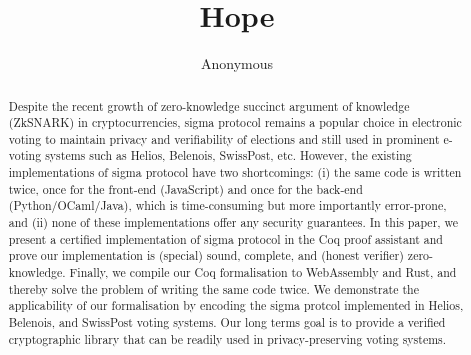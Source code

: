 \documentclass[conference,compsoc]{IEEEtran}
\begin{document}
\title{Hope}

\author{Anonymous}

\maketitle

\begin{abstract}
  Despite the recent growth of zero-knowledge succinct argument 
  of knowledge (ZkSNARK) in cryptocurrencies, 
  sigma protocol remains a popular choice in electronic voting to maintain privacy 
  and verifiability of elections and still used in prominent e-voting systems such as 
  Helios, Belenois, SwissPost, etc. However, 
  the existing implementations of sigma protocol have two 
  shortcomings: (i) the same code is written twice, once for the front-end (JavaScript)
  and once for the back-end (Python/OCaml/Java), which is time-consuming but more importantly error-prone, 
  and (ii) none of these implementations offer any security guarantees. 
  In this paper, we present a certified implementation of sigma protocol in the Coq proof assistant and
  prove our implementation is (special) sound, complete, and 
  (honest verifier) zero-knowledge. Finally, 
  we compile our Coq formalisation to WebAssembly and Rust, and 
  thereby solve the problem of writing the same code twice. 
  We demonstrate the applicability of our
  formalisation by encoding the sigma protcol implemented in 
  Helios, Belenois, and SwissPost voting systems. 
  Our long terms goal is to provide a verified cryptographic library that can be 
  readily used in privacy-preserving voting systems.
\end{abstract}





%
\IEEEpeerreviewmaketitle



\iffalse
\end{document}
